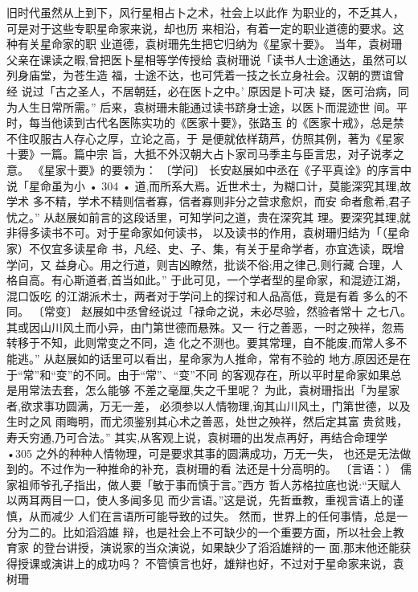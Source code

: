 旧时代虽然从上到下，风行星相占卜之术，社会上以此作
为职业的，不乏其人，可是对于这些专职星命家来说，却也历
来相沿，有着一定的职业道德的要求。这种有关星命家的职
业道德，袁树珊先生把它归纳为《星家十要》。
当年，袁树珊父亲在课读之暇,曾把医卜星相等学传授给
袁树珊说「读书人士途通达，虽然可以列身庙堂，为苍生造
福，士途不达，也可凭着一技之长立身社会。汉朝的贾谊曾经
说过「古之圣人，不居朝廷，必在医卜之中。' 原因是卜可决
疑，医可治病，同为人生日常所需。”
后来，袁树珊未能通过读书跻身士途，以医卜而混迹世
间。平时，每当他读到古代名医陈实功的《医家十要》，张路玉
的《医家十戒》，总是禁不住叹服古人存心之厚，立论之高，于
是便就依样葫芦，仿照其例，著为《星家十要》一篇。篇中宗
旨，大抵不外汉朝大占卜家司马季主与臣言忠，对子说孝之
意。
《星家十要》的要领为：
〔学问〕
长安赵展如中丞在《子平真诠》的序言中说「星命虽为小
• 304 •
道,而所系大焉。近世术士，为糊口计，莫能深究其理,故学术
多不精，学术不精则信者寡，信者寡则非分之营求愈炽，而安
命者愈希,君子忧之。”
从赵展如前言的这段话里，可知学问之道，贵在深究其
理。要深究其理,就非得多读书不可。对于星命家如何读书，
以及读书的作用，袁树珊归结为「（星命家）不仅宜多读星命
书，凡经、史、子、集，有关于星命学者，亦宜选读，既增学问，又
益身心。用之行道，则吉凶瞭然，批谈不俗;用之律己,则行藏
合理，人格自高。有心斯道者,首当如此。”
于此可见，一个学者型的星命家，和混迹江湖，混口饭吃
的江湖派术士，两者对于学问上的探讨和人品高低，竟是有着
多么的不同。
〔常变〕
赵展如中丞曾经说过「禄命之说，未必尽验，然验者常十
之七八。其或因山川风土而小异，由门第世德而悬殊。又一
行之善恶，一时之殃祥，忽焉转移于不知，此则常变之不同，造
化之不测也。要其常理，自不能废,而常人多不能逃。”
从赵展如的话里可以看出，星命家为人推命，常有不验的
地方,原因还是在于“常”和“变”的不同。由于“常”、“变”不同
的客观存在，所以平时星命家如果总是用常法去套，怎么能够
不差之毫厘,失之千里呢？
为此，袁树珊指出「为星家者,欲求事功圆满，万无一差，
必须参以人情物理,询其山川风土，门第世德，以及生时之风
雨晦明，而尤须鉴别其心术之善恶，处世之殃祥，然后定其富
贵贫贱，寿夭穷通,乃可合法。”
其实,从客观上说，袁树珊的出发点再好，再结合命理学
•305
之外的种种人情物理，可是要求其事的圆满成功，万无一失，
也还是无法做到的。不过作为一种推命的补充，袁树珊的看
法还是十分高明的。
〔言语：）
儒家祖师爷孔子指出，做人要「敏于事而慎于言。”西方
哲人苏格拉底也说:“天赋人以两耳两目一口，使人多闻多见
而少言语。”这是说，先哲垂教，重视言语上的谨慎，从而减少
人们在言语所可能导致的过失。
然而，世界上的任何事情，总是一分为二的。比如滔滔雄
辩，也是社会上不可缺少的一个重要方面，所以社会上教育家
的登台讲授，演说家的当众演说，如果缺少了滔滔雄辩的一
面,那末他还能获得授课或演讲上的成功吗？
不管慎言也好，雄辩也好，不过对于星命家来说，袁树珊
